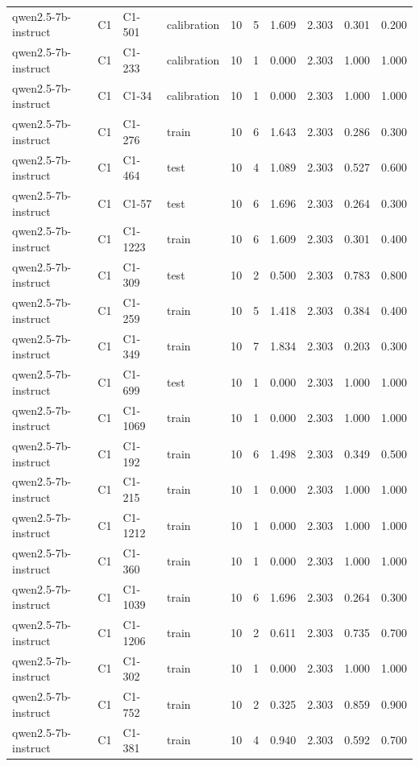 \begin{table}
\begin{tabular}{llllrrrrrr}
qwen2.5-7b-instruct & C1 & C1-501 & calibration & 10 & 5 & 1.609 & 2.303 & 0.301 & 0.200 \\
qwen2.5-7b-instruct & C1 & C1-233 & calibration & 10 & 1 & 0.000 & 2.303 & 1.000 & 1.000 \\
qwen2.5-7b-instruct & C1 & C1-34 & calibration & 10 & 1 & 0.000 & 2.303 & 1.000 & 1.000 \\
qwen2.5-7b-instruct & C1 & C1-276 & train & 10 & 6 & 1.643 & 2.303 & 0.286 & 0.300 \\
qwen2.5-7b-instruct & C1 & C1-464 & test & 10 & 4 & 1.089 & 2.303 & 0.527 & 0.600 \\
qwen2.5-7b-instruct & C1 & C1-57 & test & 10 & 6 & 1.696 & 2.303 & 0.264 & 0.300 \\
qwen2.5-7b-instruct & C1 & C1-1223 & train & 10 & 6 & 1.609 & 2.303 & 0.301 & 0.400 \\
qwen2.5-7b-instruct & C1 & C1-309 & test & 10 & 2 & 0.500 & 2.303 & 0.783 & 0.800 \\
qwen2.5-7b-instruct & C1 & C1-259 & train & 10 & 5 & 1.418 & 2.303 & 0.384 & 0.400 \\
qwen2.5-7b-instruct & C1 & C1-349 & train & 10 & 7 & 1.834 & 2.303 & 0.203 & 0.300 \\
qwen2.5-7b-instruct & C1 & C1-699 & test & 10 & 1 & 0.000 & 2.303 & 1.000 & 1.000 \\
qwen2.5-7b-instruct & C1 & C1-1069 & train & 10 & 1 & 0.000 & 2.303 & 1.000 & 1.000 \\
qwen2.5-7b-instruct & C1 & C1-192 & train & 10 & 6 & 1.498 & 2.303 & 0.349 & 0.500 \\
qwen2.5-7b-instruct & C1 & C1-215 & train & 10 & 1 & 0.000 & 2.303 & 1.000 & 1.000 \\
qwen2.5-7b-instruct & C1 & C1-1212 & train & 10 & 1 & 0.000 & 2.303 & 1.000 & 1.000 \\
qwen2.5-7b-instruct & C1 & C1-360 & train & 10 & 1 & 0.000 & 2.303 & 1.000 & 1.000 \\
qwen2.5-7b-instruct & C1 & C1-1039 & train & 10 & 6 & 1.696 & 2.303 & 0.264 & 0.300 \\
qwen2.5-7b-instruct & C1 & C1-1206 & train & 10 & 2 & 0.611 & 2.303 & 0.735 & 0.700 \\
qwen2.5-7b-instruct & C1 & C1-302 & train & 10 & 1 & 0.000 & 2.303 & 1.000 & 1.000 \\
qwen2.5-7b-instruct & C1 & C1-752 & train & 10 & 2 & 0.325 & 2.303 & 0.859 & 0.900 \\
qwen2.5-7b-instruct & C1 & C1-381 & train & 10 & 4 & 0.940 & 2.303 & 0.592 & 0.700 \\

\end{tabular}
\end{table}
